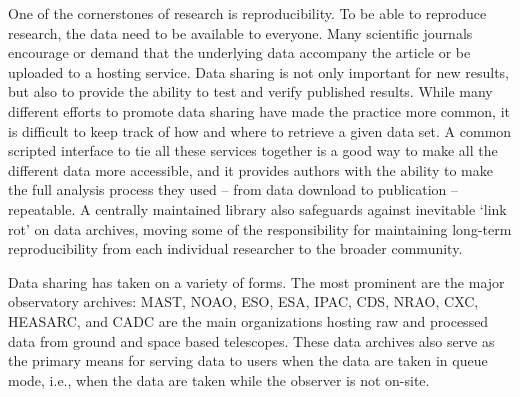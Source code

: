 \documentclass[twocolumn]{aastex62}
\begin{document}
One of the cornerstones of research is reproducibility. To be able to reproduce
research, the data need to be available to everyone. Many scientific journals
encourage or demand that the underlying data  accompany the article or be
uploaded to a hosting service. Data sharing is not only important for new
results, but also to provide the ability to test and verify published results.
While many different efforts to promote data sharing have made the practice
more common, it is difficult to keep track of how and where to retrieve a given
data set. A common scripted interface to tie all these services together is a
good way to make all the different data more accessible, and it provides
authors with the ability to make the full analysis process they used -- from
data download to publication -- repeatable.  A centrally maintained library
also safeguards against inevitable `link rot' on data archives, moving some of
the responsibility for maintaining long-term reproducibility from each
individual researcher to the broader community.

Data sharing has taken on a variety of forms.  The most prominent are the
major observatory archives: MAST, NOAO, ESO, ESA, IPAC, CDS, NRAO, CXC, HEASARC,
and CADC are the main organizations hosting raw and processed data from
ground and space based telescopes.  These data archives also serve as the
primary means for serving data to users when the data are taken in queue
mode, i.e., when the data are taken while the observer is not on-site.
\end{document}
